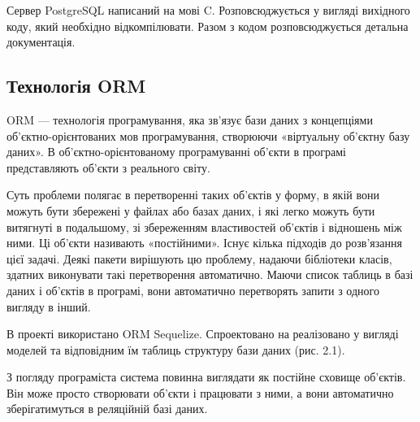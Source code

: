 Сервер PostgreSQL написаний на мові C. Розповсюджується у вигляді вихідного коду, який необхідно відкомпілювати. Разом з кодом розповсюджується детальна документація.

\subsection{Технологія ORM}
ORM — технологія програмування, яка зв'язує бази даних з концепціями об'єктно-орієнтованих мов програмування, створюючи «віртуальну об'єктну базу даних». В об'єктно-орієнтованому програмуванні об'єкти в програмі представляють об'єкти з реального світу. 

Суть проблеми полягає в перетворенні таких об'єктів у форму, в якій вони можуть бути збережені у файлах або базах даних, і які легко можуть бути витягнуті в подальшому, зі збереженням властивостей об'єктів і відношень між ними. Ці об'єкти називають «постійними». Існує кілька підходів до розв'язання цієї задачі. Деякі пакети вирішують цю проблему, надаючи бібліотеки класів, здатних виконувати такі перетворення автоматично. Маючи список таблиць в базі даних і об'єктів в програмі, вони автоматично перетворять запити з одного вигляду в інший.

В проекті використано ORM Sequelize. Спроектовано на реалізовано у вигляді моделей та відповідним їм таблиць структуру бази даних (рис. 2.1).


З погляду програміста система повинна виглядати як постійне сховище об'єктів. Він може просто створювати об'єкти і працювати з ними, а вони автоматично зберігатимуться в реляційній базі даних.

\clearpage